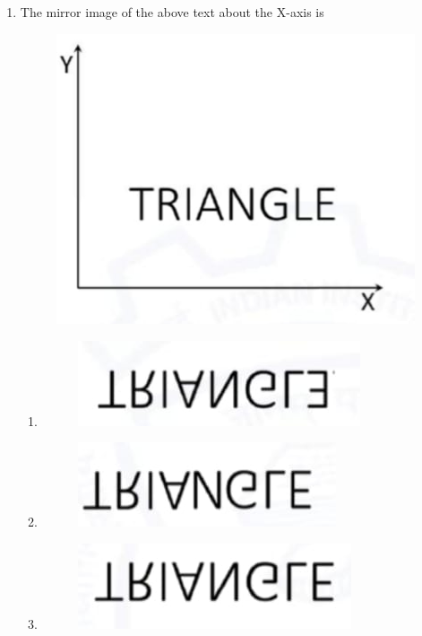 \documentclass[journal,12pt,onecolumn]{article}
\theoremstyle{remark}
\begin{document}
\begin{enumerate}
\item The mirror image of the above text about the X-axis is
\begin{figure}[H]
        \centering
        \includegraphics[width=0.7\columnwidth]{figs/1q2.jpg}
        \caption{}
        \label{fig:2}
    \end{figure}
\hfill{}
\begin{multicols}{2}
\begin{enumerate}
    \item 
    \begin{figure}[H]
        \centering
        \includegraphics[width=0.7\columnwidth]{figs/1q2a.jpg}
        \caption{}
        \label{fig:a2A}
    \end{figure}
    \item 
    \begin{figure}[H]
        \centering
        \includegraphics[width=0.7\columnwidth]{figs/1q2b.jpg}
        \caption{}
        \label{fig:a2B}
    \end{figure}
    \item 
    \begin{figure}[H]
        \centering
        \includegraphics[width=0.7\columnwidth]{figs/1q2c.jpg}

\end{figure}
\end{enumerate}
\end{multicols}
\end{enumerate}
\end{document}
